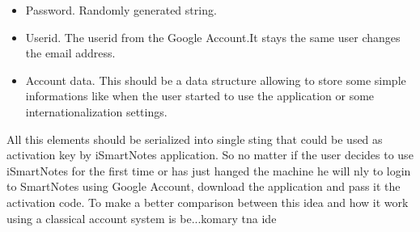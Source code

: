 \begin{itemize}
\item{Password. Randomly generated string.}
\item{Userid. The userid from the Google Account.It stays the same user changes the email address.}
\item{Account data. This should be a data structure allowing to store some simple informations like when the user started to use the application or some internationalization settings.}
\end{itemize}
All this elements should be serialized into single sting that could be used as activation key by iSmartNotes application. So no matter if the user decides to use iSmartNotes for the first time or has just hanged the machine he will nly to login to SmartNotes using Google Account, download the application and pass it the activation code. To make a better comparison between this idea and how it work using a classical account system is be...komary tna ide    

